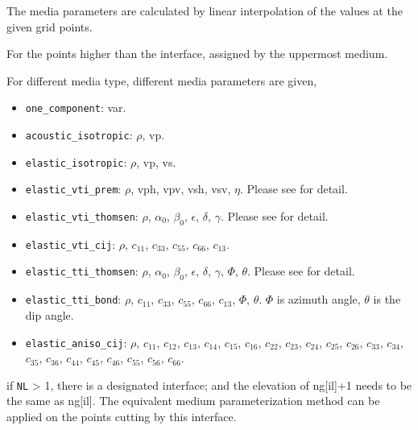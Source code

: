 \begin{itemize}
The media parameters are calculated by linear interpolation of the values at the given grid points.

For the points higher than the interface, assigned by the uppermost medium. 

For different media type, different media parameters are given,

\begin{itemize}
  \item \texttt{one\_component}: var.
  
  \item \texttt{acoustic\_isotropic}: $\rho$, vp.
  
  \item \texttt{elastic\_isotropic}: $\rho$, vp, vs.
  
  \item \texttt{elastic\_vti\_prem}: $\rho$, vph, vpv, vsh, vsv, $\eta$. Please see \citep{dziewonski1981preliminary} for detail.
  
  \item \texttt{elastic\_vti\_thomsen}: $\rho$, $\alpha_0$, $\beta_0$, $\epsilon$, $\delta$, $\gamma$. Please see \citep{ thomsen1986weak} for detail.
  
  \item \texttt{elastic\_vti\_cij}: $\rho$, $c_{11}$, $c_{33}$, $c_{55}$, $c_{66}$, $c_{13}$. 
  
  \item \texttt{elastic\_tti\_thomsen}: $\rho$, $\alpha_0$, $\beta_0$, $\epsilon$, $\delta$, $\gamma$, $\Phi$, $\theta$. Please see \citep{thomsen1986weak} for detail.

  \item \texttt{elastic\_tti\_bond}: $\rho$, $c_{11}$, $c_{33}$, $c_{55}$, $c_{66}$, $c_{13}$, $\Phi$, $\theta$. $\Phi$ is azimuth angle, $\theta$ is the dip angle.

  \item \texttt{elastic\_aniso\_cij}: $\rho$, $c_{11}$, $c_{12}$, $c_{13}$, $c_{14}$, $c_{15}$, $c_{16}$,  
                                      $c_{22}$, $c_{23}$, $c_{24}$, $c_{25}$, $c_{26}$, 
                                      $c_{33}$, $c_{34}$, $c_{35}$, $c_{36}$, $c_{44}$,
                                      $c_{45}$, $c_{46}$, $c_{55}$, $c_{56}$, $c_{66}$.
\end{itemize}

\end{itemize}
if \texttt{NL} > 1, there is a designated interface; and the elevation of ng[il]+1 needs to be the same as ng[il]. The equivalent medium parameterization method can be applied on the points cutting by this interface.

